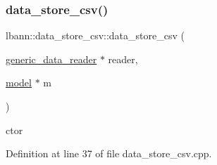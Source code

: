 \subsubsection{\texorpdfstring{data\+\_\+store\+\_\+csv()}{data\_store\_csv()}\hspace{0.1cm}{\footnotesize\ttfamily [1/2]}}
{\footnotesize\ttfamily lbann\+::data\+\_\+store\+\_\+csv\+::data\+\_\+store\+\_\+csv (\begin{DoxyParamCaption}\item[{\hyperlink{classlbann_1_1generic__data__reader}{generic\+\_\+data\+\_\+reader} $\ast$}]{reader,  }\item[{\hyperlink{classlbann_1_1model}{model} $\ast$}]{m }\end{DoxyParamCaption})}



ctor 



Definition at line 37 of file data\+\_\+store\+\_\+csv.\+cpp.


